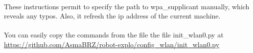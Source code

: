 \documentclass[12pt]{report}
\begin{document}
\paragraph{}
These instructions permit to specify the path to wpa\_supplicant manually, which reveals any typos. Also, it refresh the ip address of the current machine.

\paragraph{}
You can easily copy the commands from the file  the file init\_wlan0.py at      \url{https://github.com/AsmaBRZ/robot-explo/config_wlan/init_wlan0.py}
\end{document}
